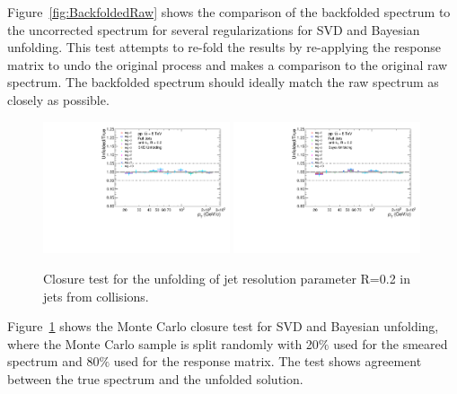 Figure~\ref{fig:BackfoldedRaw} shows the comparison of the backfolded spectrum to the uncorrected spectrum for several regularizations for SVD and Bayesian unfolding. This test attempts to re-fold the results by re-applying the response matrix to undo the original process and makes a comparison to the original raw spectrum. The backfolded spectrum should ideally match the raw spectrum as closely as possible.


\begin{figure}[hbt!]
    \centering
    \begin{multicols}{2}
            \includegraphics[width=0.49\textwidth]{figures/UnfoldingComparisons/Closure/RatioClosure1DSvd_R02.pdf}
        \vfill\null
        \columnbreak
            \includegraphics[width=0.49\textwidth]{figures/UnfoldingComparisons/Closure/RatioClosure1DBayes_R02.pdf}
        \vfill\null
    \end{multicols}
    \caption{Closure test for the unfolding of jet resolution parameter R=0.2 in jets from \pp collisions.}
    \label{fig:Closure}
\end{figure}


Figure~\ref{fig:Closure} shows the Monte Carlo closure test for SVD and Bayesian unfolding, where the Monte Carlo sample is split randomly with 20$\%$ used for the smeared spectrum and 80$\%$ used for the response matrix. The test shows agreement between the true spectrum and the unfolded solution.

